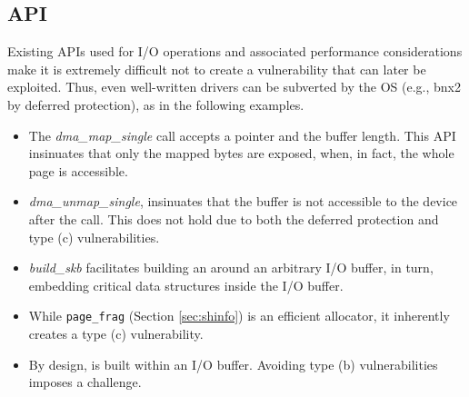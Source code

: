 \subsection{API}\label{sec:api}

Existing APIs used for I/O operations and associated performance considerations make it is extremely difficult not to create a \subpage{} vulnerability that can later be exploited. Thus, even well-written drivers can be subverted by the OS (e.g., bnx2 by deferred protection), as in the following examples.

    \begin{itemize}[wide, labelwidth=!, labelindent=3pt]
        \item The \textit{dma\_map\_single} call accepts a pointer and the buffer length. This API insinuates that only the mapped bytes are exposed, when, in fact, the whole page is accessible.
        \item \textit{dma\_unmap\_single}, insinuates that the buffer is not accessible to the device after the call. This does not hold due to both the deferred protection and type (c) \subpage{} vulnerabilities.
        \item \textit{build\_skb} facilitates building an \skb{} around an arbitrary I/O buffer, in turn, embedding critical data structures inside the I/O buffer.
        \item While \texttt{page\_frag} (Section \ref{sec:shinfo}) is an efficient allocator, it inherently creates a type (c) \subpage{} vulnerability.
            \item By design, \shinfo{} is built within an I/O buffer. Avoiding type (b) \subpage{} vulnerabilities imposes a challenge.
    \end{itemize}


